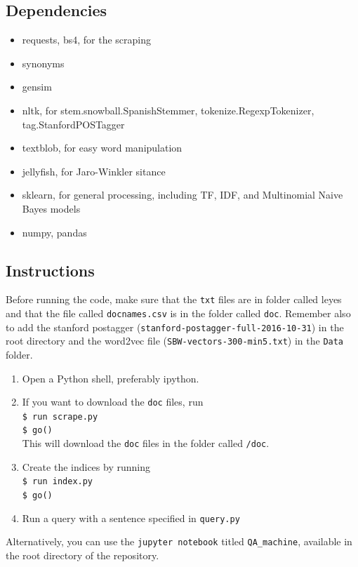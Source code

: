 \documentclass[letterpaper, margin=1in]{article}
\begin{document}
\subsection{Dependencies}
\begin{itemize}
\item requests, bs4, for the scraping
\item synonyms
\item gensim 
\item nltk, for stem.snowball.SpanishStemmer, tokenize.RegexpTokenizer, tag.StanfordPOSTagger
\item textblob, for easy word manipulation
\item jellyfish, for Jaro-Winkler sitance
\item sklearn, for general processing, including TF, IDF, and Multinomial Naive Bayes models
\item numpy, pandas

\end{itemize}

\subsection{Instructions}
Before running the code, make sure that the \texttt{txt} files are in folder called leyes and that the file called \texttt{docnames.csv} is in the folder called \texttt{doc}. Remember also to add the stanford postagger (\texttt{stanford-postagger-full-2016-10-31}) in the root directory and the word2vec file (\texttt{SBW-vectors-300-min5.txt}) in the \texttt{Data} folder.

\begin{enumerate}
\item Open a Python shell, preferably ipython.
\item If you want to download the \texttt{doc} files, run \\ \texttt{\$ run scrape.py} \\ \texttt{\$ go()} \\ This will download the \texttt{doc} files in the folder called \texttt{/doc}.
\item Create the indices by running \\ \texttt{\$ run index.py} \\ \texttt{\$ go()}
\item Run a query with a sentence specified in \texttt{query.py}
\end{enumerate}

Alternatively, you can use the \texttt{jupyter notebook} titled \texttt{QA{\_}machine}, available in the root directory of the repository.
\end{document}
